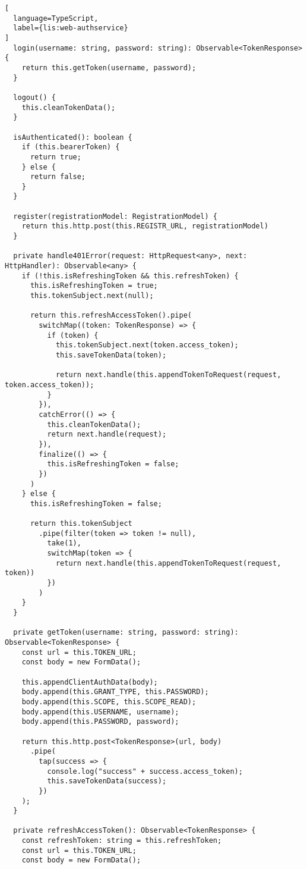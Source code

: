 \begin{lstlisting}[
  language=TypeScript,
  label={lis:web-authservice}
]
  login(username: string, password: string): Observable<TokenResponse> {
    return this.getToken(username, password);
  }

  logout() {
    this.cleanTokenData();
  }

  isAuthenticated(): boolean {
    if (this.bearerToken) {
      return true;
    } else {
      return false;
    }
  }

  register(registrationModel: RegistrationModel) {
    return this.http.post(this.REGISTR_URL, registrationModel)
  }

  private handle401Error(request: HttpRequest<any>, next: HttpHandler): Observable<any> {
    if (!this.isRefreshingToken && this.refreshToken) {
      this.isRefreshingToken = true;
      this.tokenSubject.next(null);

      return this.refreshAccessToken().pipe(
        switchMap((token: TokenResponse) => {
          if (token) {
            this.tokenSubject.next(token.access_token);
            this.saveTokenData(token);

            return next.handle(this.appendTokenToRequest(request, token.access_token));
          }
        }),
        catchError(() => {
          this.cleanTokenData();
          return next.handle(request);
        }),
        finalize(() => {
          this.isRefreshingToken = false;
        })
      )
    } else {
      this.isRefreshingToken = false;

      return this.tokenSubject
        .pipe(filter(token => token != null),
          take(1),
          switchMap(token => {
            return next.handle(this.appendTokenToRequest(request, token))
          })
        )
    }
  }

  private getToken(username: string, password: string): Observable<TokenResponse> {
    const url = this.TOKEN_URL;
    const body = new FormData();

    this.appendClientAuthData(body);
    body.append(this.GRANT_TYPE, this.PASSWORD);
    body.append(this.SCOPE, this.SCOPE_READ);
    body.append(this.USERNAME, username);
    body.append(this.PASSWORD, password);

    return this.http.post<TokenResponse>(url, body)
      .pipe(
        tap(success => {
          console.log("success" + success.access_token);
          this.saveTokenData(success);
        })
    );
  }

  private refreshAccessToken(): Observable<TokenResponse> {
    const refreshToken: string = this.refreshToken;
    const url = this.TOKEN_URL;
    const body = new FormData();


\end{lstlisting}
